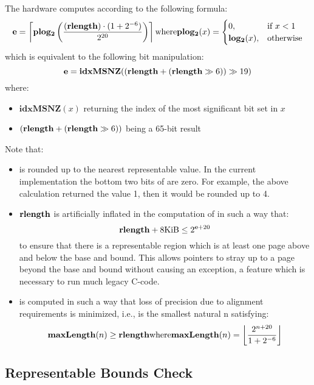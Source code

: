 \noindent
The hardware computes \cexponent{} according to the following formula:
\[\cexponent{} = \left\lceil \mathbf{plog_2}\left(\frac{(\rlength{}) \cdot (1+2^{-6})}{2^{20}}\right) \right\rceil\hfill{}\text{where}\hfill{}\mathbf{plog_2}(x)=\begin{cases}
0, &\text{if }x<1\\
\mathbf{log_2}(x), &\text{otherwise}
\end{cases}\]
which is equivalent to the following bit manipulation:
\[{\bf e}{} = \mathbf{idxMSNZ}((\textbf{rlength}{} + (\textbf{rlength}{} \gg 6))\gg19)\]%
where:
\begin{itemize}
\item $\mathbf{idxMSNZ}(x)$ returning the index of the most significant bit set in $x$
\item $(\textbf{rlength}{} + (\textbf{rlength}{} \gg 6))$ being a 65-bit result
\end{itemize}
\pagebreak[2]
\noindent
Note that:\nopagebreak[4]%
\begin{itemize}
\item \cexponent{} is rounded up to the nearest representable value.
  In the current implementation the bottom two bits of \cexponent{}
  are zero.  For example, the above \cexponent{} calculation returned
  the value 1, then it would be rounded up to 4.
\item $\textbf{rlength}{}$ is artificially inflated in the computation of
  \cexponent{} in such a way that:
  \[\textbf{rlength}{} + 8 \text{KiB} \leq 2^{{\bf e}{}+20}\]
  to ensure that there is a representable region which is at least one
  page above and below the base and bound.  This allows pointers to
  stray up to a page beyond the base and bound without causing an
  exception, a feature which is necessary to run much legacy C-code.
\item \cexponent{} is computed in such a way that loss of precision
  due to alignment requirements is minimized, i.e., \cexponent{} is
  the smallest natural n satisfying:
  \[\mathbf{maxLength}(n) \geq \rlength{}\hfill\text{where}\hfill
  \mathbf{maxLength}(n)=\left\lfloor \frac{2^{n+20}}{1+2^{-6}} \right\rfloor\hfill\]
\end{itemize}

\subsection{Representable Bounds Check}

